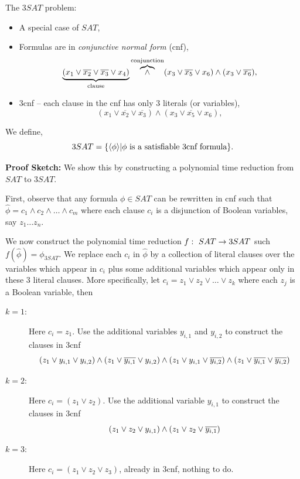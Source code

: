\documentclass[a4paper,blends,pdf,colorBG,slideColor]{prosper}
\begin{document}
{\small
The $3SAT$ problem:
\begin{itemize}
\item A special case of $SAT$,
\item Formulas are in {\em conjunctive normal form} (cnf),
\[
\underbrace{(x_1 \vee \overline{x_2} \vee \overline{x_3} \vee x_4)}_{\mbox{\scriptsize clause}} \overbrace{\wedge}^{\mbox{\scriptsize conjunction}} (x_3  \vee \overline{x_5} \vee x_6)\wedge(x_3 \vee \overline{x_6}),
\]
\item 3cnf -- each clause in the cnf has only 3 literals (or variables),
\[
(x_1 \vee \overline{x_2} \vee \overline{x_3}) \wedge (x_3 \vee \overline{x_5} \vee x_6),
\]
\end{itemize}

We define,
\[
3SAT = \{ \langle {\phi} \rangle | \mbox{$\phi$  is a satisfiable 3cnf formula}\}.
\]

}
\es

{\small
{}

{\bf Proof Sketch:} We show this by constructing a polynomial time reduction from $SAT$
to $3SAT$.

First, observe that any formula $\phi \in SAT$ can be rewritten in cnf such that
$\hat{\phi} = c_1 \wedge c_2 \wedge \ldots \wedge c_m$ where each clause $c_i$ is a
disjunction of Boolean variables, say $z_1 \ldots z_n$.

We now construct the polynomial time reduction $f\,\colon\; SAT \rightarrow 3SAT$ such
$f(\hat{\phi}) = \phi_{3SAT}$.  We replace each $c_i$ in $\hat{\phi}$ by a collection
of literal clauses over the variables which appear in $c_i$ plus some additional variables which appear only in these 3 literal clauses.  More specifically, let $c_i = z_1 \vee z_2 \vee \ldots \vee z_k$ where each $z_j$ is a Boolean variable, then
\begin{description}
\item[$k = 1$:] Here $c_i = z_1$.  Use the additional variables $y_{i,1}$ and $y_{i,2}$
to construct the clauses in 3cnf
\[
(z_1\vee y_{i,1}\vee y_{i,2}) \wedge (z_1\vee \overline{y_{i,1}}\vee y_{i,2}) \wedge (z_1\vee y_{i,1}\vee \overline{y_{i,2}}) \wedge (z_1\vee \overline{y_{i,1}}\vee \overline{y_{i,2}})
\]
\item[$k=2$:] Here $c_i = (z_1 \vee z_2)$.  Use the additional variable $y_{i,1}$ to
construct the clauses in 3cnf
\[
(z_1 \vee z_2 \vee y_{i,1}) \wedge (z_1 \vee z_2 \vee \overline{y_{i,1}}) 
\]
\item[$k = 3$:] Here $c_i = (z_1 \vee z_2 \vee z_3)$, already in 3cnf, nothing to do.
\end{description}

}
\es
\end{document}

